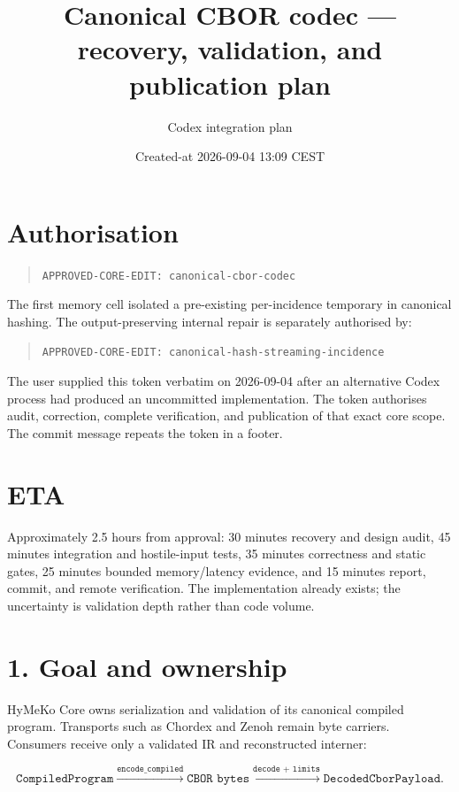 \documentclass[11pt,a4paper]{article}
\title{Canonical CBOR codec --- recovery, validation, and publication plan}
\author{Codex integration plan}
\date{Created-at 2026-09-04 13:09 CEST}
\begin{document}
\maketitle

\section*{Authorisation}

\begin{quote}
\texttt{APPROVED-CORE-EDIT: canonical-cbor-codec}
\end{quote}

The first memory cell isolated a pre-existing per-incidence temporary in canonical hashing. The
output-preserving internal repair is separately authorised by:

\begin{quote}
\texttt{APPROVED-CORE-EDIT: canonical-hash-streaming-incidence}
\end{quote}

The user supplied this token verbatim on 2026-09-04 after an alternative Codex process had produced
an uncommitted implementation. The token authorises audit, correction, complete verification, and
publication of that exact core scope. The commit message repeats the token in a footer.

\section*{ETA}

Approximately 2.5 hours from approval: 30 minutes recovery and design audit, 45 minutes integration
and hostile-input tests, 35 minutes correctness and static gates, 25 minutes bounded memory/latency
evidence, and 15 minutes report, commit, and remote verification. The implementation already exists;
the uncertainty is validation depth rather than code volume.

\section*{1. Goal and ownership}

HyMeKo Core owns serialization and validation of its canonical compiled program. Transports such as
Chordex and Zenoh remain byte carriers. Consumers receive only a validated IR and reconstructed
interner:

\[
\texttt{CompiledProgram} \xrightarrow{\texttt{encode\_compiled}}
\texttt{CBOR bytes} \xrightarrow{\texttt{decode + limits}}
\texttt{DecodedCborPayload}.
\]
\end{document}
